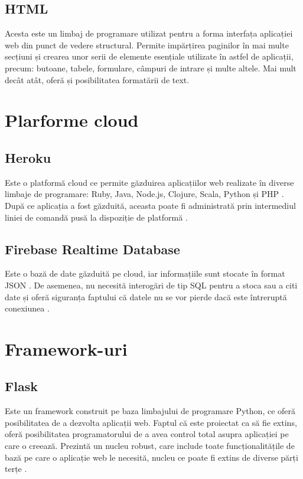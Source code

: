\subsection{HTML}

	Acesta este un limbaj de programare utilizat pentru a forma interfața aplicației web din punct de vedere structural. Permite impărțirea paginilor în mai multe secțiuni și crearea unor serii de elemente esențiale utilizate în astfel de aplicații, precum: butoane, tabele, formulare, câmpuri de intrare și multe altele. Mai mult decât atât, oferă și posibilitatea formatării de text.  


\section{Plarforme cloud}

\subsection{Heroku}

	Este o platformă cloud ce permite găzduirea aplicațiilor web realizate în diverse limbaje de programare: Ruby, Java, Node.js, Clojure, Scala, Python și PHP \cite{heroku}. După ce aplicația a fost găzduită, aceasta poate fi administrată prin intermediul liniei de comandă pusă la dispoziție de platformă \cite{heroku}.

\subsection{Firebase Realtime Database}

	Este o bază de date găzduită pe cloud, iar informațiile sunt stocate în format JSON \cite{firebase}. De asemenea, nu necesită interogări de tip SQL pentru a stoca sau a citi date și oferă siguranța faptului că datele nu se vor pierde dacă este întreruptă conexiunea \cite{firebase}.

\section{Framework-uri}

\subsection{Flask}

	Este un framework construit pe baza limbajului de programare Python, ce oferă posibilitatea de a dezvolta aplicații web. Faptul că este proiectat ca să fie extins, oferă posibilitatea programatorului de a avea control total asupra aplicației pe care o creează. Prezintă un nucleu robust, care include toate funcționalitățile de bază pe care o aplicație web le necesită, nucleu ce poate fi extins de diverse părți terțe \cite{flask}.

